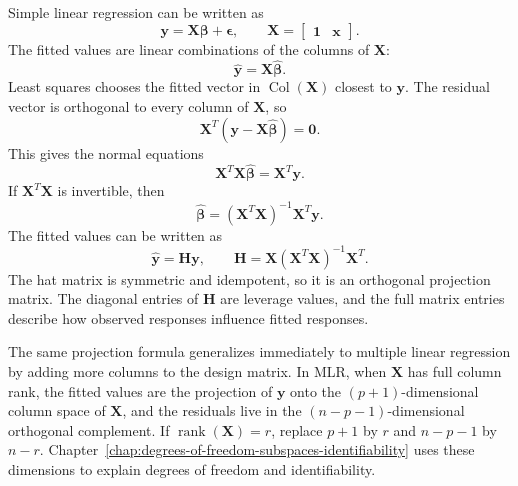 Simple linear regression can be written as
\begin{equation}
  \mathbf{y}=\mathbf{X}\boldsymbol{\beta}+\boldsymbol{\epsilon},
  \qquad
  \mathbf{X}=\begin{bmatrix}\mathbf{1}&\mathbf{x}\end{bmatrix}.
\end{equation}
The fitted values are linear combinations of the columns of \(\mathbf{X}\):
\begin{equation}
  \widehat{\mathbf{y}}=\mathbf{X}\widehat{\boldsymbol{\beta}}.
\end{equation}
Least squares chooses the fitted vector in \(\operatorname{Col}(\mathbf{X})\) closest to \(\mathbf{y}\).  The residual vector is orthogonal to every column of \(\mathbf{X}\), so
\begin{equation}
  \mathbf{X}^T(\mathbf{y}-\mathbf{X}\widehat{\boldsymbol{\beta}})=\mathbf{0}.
\end{equation}
This gives the normal equations
\begin{equation}
  \mathbf{X}^T\mathbf{X}\widehat{\boldsymbol{\beta}}=\mathbf{X}^T\mathbf{y}.
\end{equation}
If \(\mathbf{X}^T\mathbf{X}\) is invertible, then
\begin{equation}
  \widehat{\boldsymbol{\beta}}=(\mathbf{X}^T\mathbf{X})^{-1}\mathbf{X}^T\mathbf{y}.
\end{equation}
The fitted values can be written as
\begin{equation}
  \widehat{\mathbf{y}}=\mathbf{H}\mathbf{y},
  \qquad
  \mathbf{H}=\mathbf{X}(\mathbf{X}^T\mathbf{X})^{-1}\mathbf{X}^T.
\end{equation}
The hat matrix is symmetric and idempotent, so it is an orthogonal projection matrix.  The diagonal entries of \(\mathbf{H}\) are leverage values, and the full matrix entries describe how observed responses influence fitted responses.

The same projection formula generalizes immediately to multiple linear regression by adding more columns to the design matrix.  In MLR, when \(\mathbf{X}\) has full column rank, the fitted values are the projection of \(\mathbf{y}\) onto the \((p+1)\)-dimensional column space of \(\mathbf{X}\), and the residuals live in the \((n-p-1)\)-dimensional orthogonal complement.  If \(\operatorname{rank}(\mathbf{X})=r\), replace \(p+1\) by \(r\) and \(n-p-1\) by \(n-r\).  Chapter~\ref{chap:degrees-of-freedom-subspaces-identifiability} uses these dimensions to explain degrees of freedom and identifiability.

